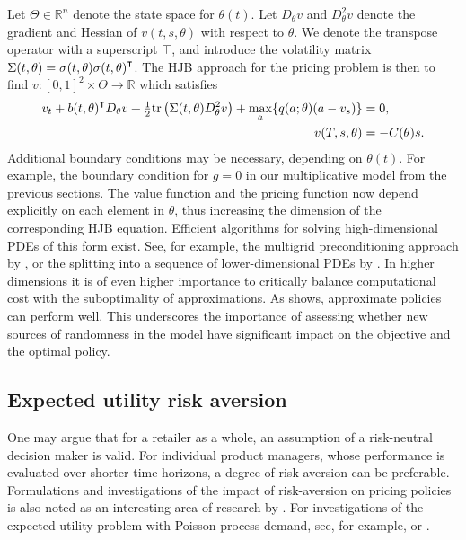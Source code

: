 \documentclass[main.tex]{subfiles}
\begin{document}
Let $\Theta\in\mathbb{R}^n$ denote the state space for
$\theta(t)$.
Let $D_\theta v$ and $D_\theta^2v$ denote the gradient and Hessian of
$v(t,s,\theta)$ with respect to $\theta$. We denote the transpose
operator with a superscript $\intercal$, and introduce the
volatility matrix $\Sigma(t,\theta) =
\sigma(t,\theta){\sigma(t,\theta)}^\intercal$.
The HJB approach for the pricing problem is then to find
$v:{[0,1]}^2\times\Theta\to\mathbb{R}$ which satisfies
\begin{align}
  v_t+{b(t,\theta)}^\intercal D_\theta v
  + {\textstyle\frac{1}{2}}\mbox{tr}\left( \Sigma(t,\theta)
  D_\theta^2v \right)
  +\max_{a}\{q(a;\theta)(a-v_s)\}&=0,\\
  v(T,s,\theta) &= -C(\theta)s.
\end{align}
Additional boundary conditions may be necessary, depending on
$\theta(t)$. For example, the boundary condition for $g=0$ in our
multiplicative model from the previous sections.
The value function and the pricing function now depend
explicitly on each element in $\theta$, thus increasing the dimension
of the corresponding HJB equation. Efficient algorithms for solving
high-dimensional PDEs of this form exist. See, for example, the
multigrid preconditioning approach by \citet{reisinger2017boundary}, or
the splitting into a sequence of lower-dimensional PDEs by \citet{reisinger2017finite}.
In higher dimensions it is of even higher importance to critically
balance computational cost with the suboptimality of
approximations. As  shows, approximate
policies can perform well. This underscores the importance of assessing whether
new sources of randomness in the model have significant impact on the
objective and the optimal policy.


\subsection{Expected utility risk aversion}
One may argue that for a retailer as a whole, an assumption of a
risk-neutral decision maker is valid. For individual product managers,
whose performance is evaluated over shorter time horizons, a degree of
risk-aversion can be preferable. Formulations and investigations of the
impact of risk-aversion on pricing policies is also noted as an
interesting area of research by \citet{bitran2003overview}.
For investigations of the expected utility problem with Poisson process
demand, see, for example, \citet{lim2007relative} or \citet{feng2008risk}.
\end{document}
